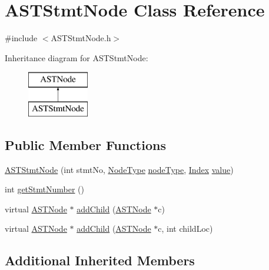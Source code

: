 \hypertarget{class_a_s_t_stmt_node}{\section{A\-S\-T\-Stmt\-Node Class Reference}
\label{class_a_s_t_stmt_node}
}


{\ttfamily \#include $<$A\-S\-T\-Stmt\-Node.\-h$>$}

Inheritance diagram for A\-S\-T\-Stmt\-Node\-:\begin{figure}[H]
\begin{center}
\leavevmode
\includegraphics[height=2.000000cm]{class_a_s_t_stmt_node}
\end{center}
\end{figure}
\subsection*{Public Member Functions}
\begin{DoxyCompactItemize}
\item 
\hyperlink{class_a_s_t_stmt_node_abf3ac4ab701786816ee76defcdb3c328}{A\-S\-T\-Stmt\-Node} (int stmt\-No, \hyperlink{class_a_s_t_node_a4fd016b5f0e44ea6aca3542d27de3859}{Node\-Type} \hyperlink{class_a_s_t_node_a15fcdbd8403a1169b06d948a827fde55}{node\-Type}, \hyperlink{_a_s_t_stmt_node_8h_a4a0e50e01fef3e431767a928c2631cab}{Index} \hyperlink{class_a_s_t_node_a136d1712e8cfdeb4908aceb22abc3de7}{value})
\item 
int \hyperlink{class_a_s_t_stmt_node_a7ccabe8c03f4ba0eb31ac4850725c4e2}{get\-Stmt\-Number} ()
\item 
virtual \hyperlink{class_a_s_t_node}{A\-S\-T\-Node} $\ast$ \hyperlink{class_a_s_t_stmt_node_a0396498d6bbccecd8a71a4251d237380}{add\-Child} (\hyperlink{class_a_s_t_node}{A\-S\-T\-Node} $\ast$c)
\item 
virtual \hyperlink{class_a_s_t_node}{A\-S\-T\-Node} $\ast$ \hyperlink{class_a_s_t_stmt_node_aa265b32dab6bb7fcb8b7f1e8a9687f9a}{add\-Child} (\hyperlink{class_a_s_t_node}{A\-S\-T\-Node} $\ast$c, int child\-Loc)
\end{DoxyCompactItemize}
\subsection*{Additional Inherited Members}


